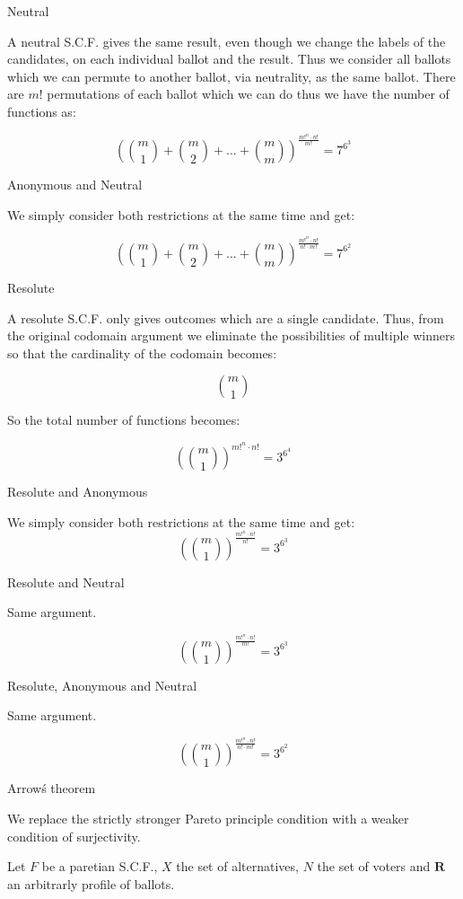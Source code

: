 \documentclass[12pt]{article}
\newenvironment{question}[2][Question]{\begin{trivlist}
\item[\hskip \labelsep {\bfseries #1}\hskip \labelsep {\bfseries #2.}]}{\end{trivlist}}
\newenvironment{answer}[2][Answer]{\begin{trivlist}
\item[\hskip \labelsep {\bfseries #1}\hskip \labelsep {\bfseries #2:}]}{\end{trivlist}}
\begin{document}
\begin{answer}{c)}{Neutral}

A neutral S.C.F. gives the same result, even though we change the labels of the candidates, on each individual ballot and the result. Thus we consider all ballots which we can permute to another ballot, via neutrality, as the same ballot. There are $m!$ permutations of each ballot which we can do thus we have the number of functions as:

$$(\binom{m}{1} + \binom{m}{2} + ... + \binom{m}{m})^{\frac{m!^n \cdot n!}{m!}}=7^{6^3}$$
\end{answer}
\begin{answer}{d)}{Anonymous and Neutral}

We simply consider both restrictions at the same time and get:

$$(\binom{m}{1} + \binom{m}{2} + ... + \binom{m}{m})^{\frac{m!^n \cdot n!}{n! \cdot m!}}=7^{6^2}$$
\end{answer}
\begin{answer}{e)}{Resolute}

A resolute S.C.F. only gives outcomes which are a single candidate. Thus, from the original codomain argument we eliminate the possibilities of multiple winners so that the cardinality of the codomain becomes:

$$\binom{m}{1}$$

So the total number of functions becomes:

$$(\binom{m}{1})^{m!^n \cdot n!}=3^{6^4}$$
\end{answer}
\begin{answer}{f)}{Resolute and Anonymous}

We simply consider both restrictions at the same time and get:
$$(\binom{m}{1})^{\frac{m!^n \cdot n!}{n!}}=3^{6^3}$$
\end{answer}
\begin{answer}{g)}{Resolute and Neutral}

Same argument.

$$(\binom{m}{1})^{\frac{m!^n \cdot n!}{m!}}=3^{6^3}$$
\end{answer}
\begin{answer}{h)}{Resolute, Anonymous and Neutral}

Same argument.

$$(\binom{m}{1})^{\frac{m!^n \cdot n!}{n! \cdot m!}}=3^{6^2}$$
\end{answer}
\begin{question}{4}{Arrow\'s theorem}

We replace the strictly stronger Pareto principle condition with a weaker condition of surjectivity.

Let $F$ be a paretian S.C.F., $X$ the set of alternatives, $N$ the set of voters and $\boldsymbol{R}$ an arbitrarly profile of ballots.
\end{question}
\end{document}
